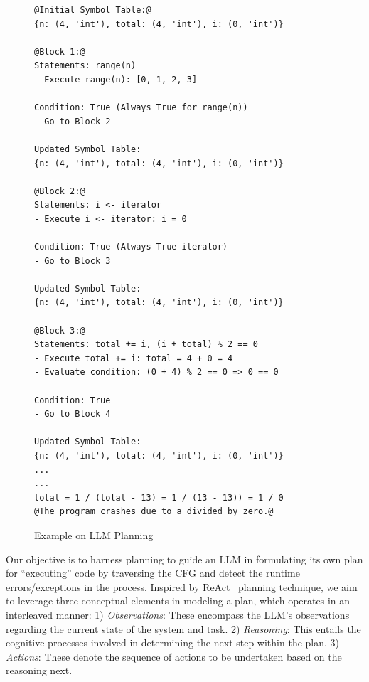 \begin{figure}
  \centering
  \footnotesize
\begin{lstlisting}[]
@Initial Symbol Table:@
{n: (4, 'int'), total: (4, 'int'), i: (0, 'int')}

@Block 1:@
Statements: range(n)
- Execute range(n): [0, 1, 2, 3]

Condition: True (Always True for range(n))
- Go to Block 2

Updated Symbol Table:
{n: (4, 'int'), total: (4, 'int'), i: (0, 'int')}

@Block 2:@
Statements: i <- iterator
- Execute i <- iterator: i = 0

Condition: True (Always True iterator)
- Go to Block 3

Updated Symbol Table:
{n: (4, 'int'), total: (4, 'int'), i: (0, 'int')}

@Block 3:@
Statements: total += i, (i + total) % 2 == 0
- Execute total += i: total = 4 + 0 = 4
- Evaluate condition: (0 + 4) % 2 == 0 => 0 == 0

Condition: True
- Go to Block 4

Updated Symbol Table:
{n: (4, 'int'), total: (4, 'int'), i: (0, 'int')}
... 
...
total = 1 / (total - 13) = 1 / (13 - 13)) = 1 / 0
@The program crashes due to a divided by zero.@
\end{lstlisting}
\vspace{-6pt}
\caption{Example on LLM Planning}
\label{fig:motiv-gpt}
\end{figure}

Our objective is to harness planning to guide an LLM in formulating
its own plan for ``executing'' code by traversing the CFG and detect
the runtime errors/exceptions in the process. Inspired by
ReAct~\cite{yao2023react} planning technique, we aim to leverage three
conceptual elements in modeling a plan, which operates in an
interleaved manner: 1) {\em Observations}: These encompass the LLM's
observations regarding the current state of the system and task. 2)
{\em Reasoning}: This entails the cognitive processes involved in
determining the next step within the plan. 3) {\em Actions}:
These denote the sequence of actions to be undertaken based on the
reasoning next.

